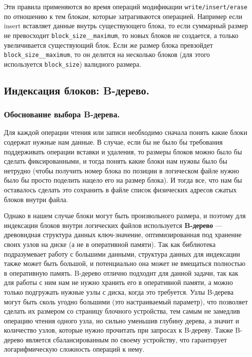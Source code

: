 Эти правила применяются во время операций модификации \texttt{write/insert/erase} по отношению к тем блокам, которые затрагиваются операцией. Например если insert вставляет данные внутрь существующего блока, то если суммарный размер не превосходит \texttt{block\_size\_\_maximum}, то новых блоков не создается, а только увеличивается существующий блок. Если же размер блока превзойдет \texttt{block\_size\_\_maximum}, то он делится на несколько блоков (для этого используется \texttt{block\_size}) валидного размера.

\subsection{Индексация блоков: B-дерево.} \label{btree}

\subsubsection{Обоснование выбора B-дерева.}

Для каждой операции чтения или записи необходимо сначала понять какие блоки содержат нужные нам данные. В случае, если бы не было бы требования поддерживать операции вставки и удаления, то размеры блоков можно было бы сделать фиксированными, и тогда понять какие блоки нам нужны было бы нетрудно (чтобы получить номер блока по позиции в логическом файле нужно было бы просто поделить нацело его на размер блока). И тогда все, что нам бы оставалось сделать это сохранить в файле список физических адресов сжатых блоков внутри файла.

Однако в нашем случае блоки могут быть произвольного размера, и поэтому для индексации блоков внутри логических файлов используется \textbf{B-дерево}\cite{bayer1972btree} --- древовидная структура данных ключ-значение, оптимизированная под хранение своих узлов на диске (а не в оперативной памяти). Так как библиотека подразумевает работу с большими данными, структура данных для индексации также может быть большой, и потенциально она может не вмещаться полностью в оперативную память. B-дерево отлично подходит для данной задачи, так как для работы с ним нам не нужно хранить его в оперативной памяти, а можно только подгружать нужные узлы с диска, когда это требуется. Узлы B-дерева могут быть сколь угодно большими (это настраиваемый параметр), что позволяет сделать их размером со страницу блочного устройства, тем самым не замедлив операцию чтения одного узла, но сильно уменьшив глубину дерева, а значит и количество узлов, которые нужно прочитать при запросах к B-дереву. Также B-дерево является сбалансированным по своему устройству, что гарантирует логарифмическую сложность операций к нему.

